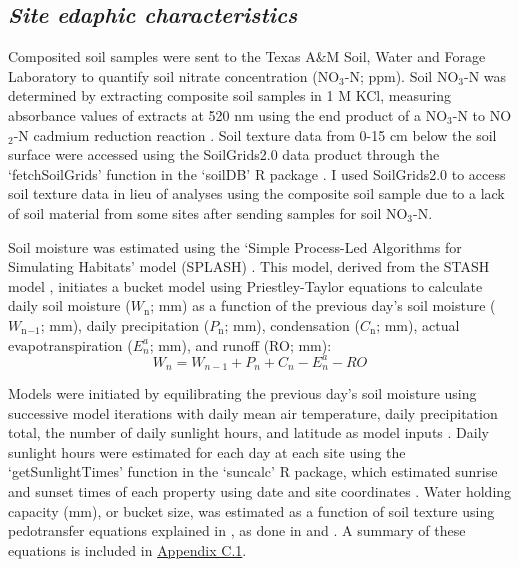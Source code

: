 \subsection{\textit{Site edaphic characteristics}}
\noindent Composited soil samples were sent to the Texas A\&M Soil, Water and Forage Laboratory to quantify soil nitrate concentration (NO$_3$-N; ppm). Soil NO$_3$-N was determined by extracting composite soil samples in 1 M KCl, measuring absorbance values of extracts at 520 nm using the end product of a NO$_3$-N to NO$_2$-N cadmium reduction reaction . Soil texture data from 0-15 cm below the soil surface were accessed using the SoilGrids2.0 data product  through the `fetchSoilGrids’ function in the ‘soilDB’ R package . I used SoilGrids2.0 to access soil texture data in lieu of analyses using the composite soil sample due to a lack of soil material from some sites after sending samples for soil NO$_3$-N.

Soil moisture was estimated using the `Simple Process-Led Algorithms for Simulating Habitats’ model (SPLASH) . This model, derived from the STASH model , initiates a bucket model using Priestley-Taylor equations  to calculate daily soil moisture ($W_\mathrm{n}$; mm) as a function of the previous day’s soil moisture ($W_\mathrm{n}{}_{-1}$; mm), daily precipitation ($P_\mathrm{n}$; mm), condensation ($C_\mathrm{n}$; mm), actual evapotranspiration ($E_{n}^a$; mm), and runoff (RO; mm):
\begin{equation}
    \label{eq_4.7}
    W_n = W_{n-1} + P_n + C_n - E_{n}^{a} - RO
\end{equation}

\noindent Models were initiated by equilibrating the previous day's soil moisture using successive model iterations with daily mean air temperature, daily precipitation total, the number of daily sunlight hours, and latitude as model inputs . Daily sunlight hours were estimated for each day at each site using the `getSunlightTimes’ function in the `suncalc’ R package, which estimated sunrise and sunset times of each property using date and site coordinates . Water holding capacity (mm), or bucket size, was estimated as a function of soil texture using pedotransfer equations explained in , as done in  and . A summary of these equations is included in \hyperref[appendix.c1]{Appendix C.1}.

